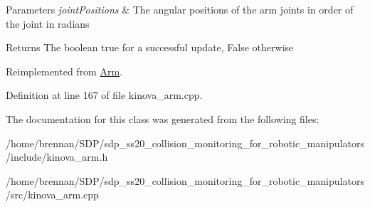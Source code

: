 \begin{DoxyParams}{Parameters}
{\em joint\+Positions} & The angular positions of the arm joints in order of the joint in radians \\
\hline
\end{DoxyParams}
\begin{DoxyReturn}{Returns}
The boolean true for a successful update, False otherwise 
\end{DoxyReturn}


Reimplemented from \hyperlink{class_arm_abc38e64d0f6f3ea416626208baefa28d}{Arm}.



Definition at line 167 of file kinova\+\_\+arm.\+cpp.



The documentation for this class was generated from the following files\+:\begin{DoxyCompactItemize}
\item 
/home/brennan/\+S\+D\+P/sdp\+\_\+ss20\+\_\+collision\+\_\+monitoring\+\_\+for\+\_\+robotic\+\_\+manipulators/include/kinova\+\_\+arm.\+h\item 
/home/brennan/\+S\+D\+P/sdp\+\_\+ss20\+\_\+collision\+\_\+monitoring\+\_\+for\+\_\+robotic\+\_\+manipulators/src/kinova\+\_\+arm.\+cpp\end{DoxyCompactItemize}
